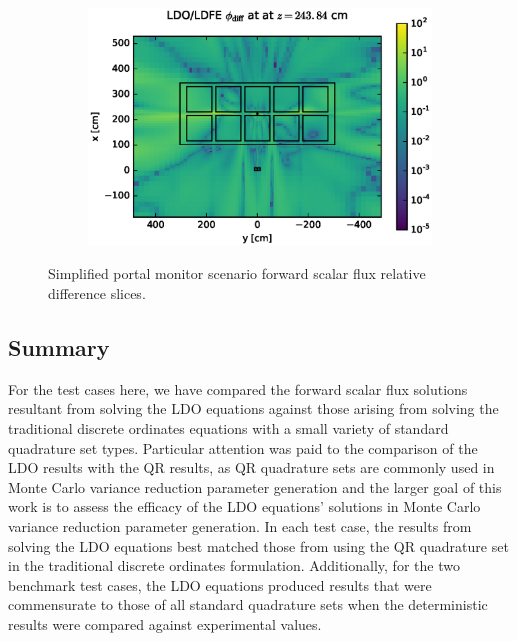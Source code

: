 \begin{figure}[!htb]
\ContinuedFloat
\begin{subfigure}{\textwidth}
\centering
\includegraphics[max height=0.445\textheight]
{img/cargo-plots/fwd/flux-diff-rel-ldfe01.eps}
\end{subfigure}
\caption{Simplified portal monitor scenario forward scalar flux relative difference 
         slices.}
\label{cargo-fwd-diff-rel}
\end{figure}

\FloatBarrier
\subsection{Summary}

For the test cases here, we have compared the forward scalar flux solutions resultant 
from solving the LDO equations against those arising from solving the traditional
discrete ordinates equations with a small variety of standard quadrature set types.
Particular attention was paid to the comparison of the LDO results with the QR 
results, as QR quadrature sets are commonly used in Monte Carlo variance reduction
parameter generation and the larger goal of this work is to assess the efficacy of the
LDO equations' solutions in Monte Carlo variance reduction parameter generation. In
each test case, the results from solving the LDO equations best matched those from
using the QR quadrature set in the traditional discrete ordinates formulation.
Additionally, for the two benchmark test cases, the LDO equations produced results
that were commensurate to those of all standard quadrature sets when the deterministic
results were compared against experimental values.

